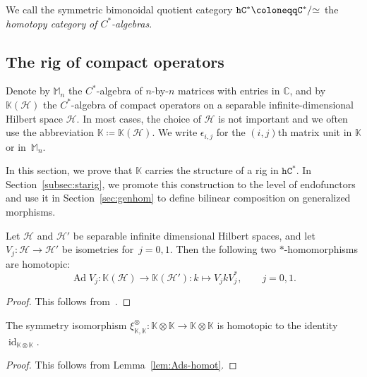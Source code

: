 \documentclass[10pt]{simplearticle}
\newcommand{\Ad}{\operatorname*{Ad}}
\newcommand{\id}{\operatorname{id}}
\newcommand{\Cstar}{\mathtt{C^{*}}}
\newcommand{\hCstar}{\mathtt{hC^{*}}}
\newcommand{\oK}{\mathbb{K}}
\newcommand{\oM}{\mathbb{M}}
\newcommand{\modrel}[1]{/\hspace{-0.6ex}#1\hspace{0.1ex}}
\begin{document}
\begin{defn}
We call the symmetric bimonoidal quotient category $\hCstar\coloneqq\Cstar\modrel{\simeq}$
the \emph{homotopy category} \emph{of $C^{*}$-algebras}.

\end{defn}

\subsection{\label{subsec:rig-comp}The rig of compact operators}

Denote by $\oM_{n}$ the $C^{*}$-algebra of $n$-by-$n$ matrices
with entries in $\mathbb{C}$, and by $\oK(\mathcal{H})$ the $C^{*}$-algebra
of compact operators on a separable infinite-dimensional Hilbert space
$\mathcal{H}$. In most cases, the choice of $\mathcal{H}$ is not
important and we often use the abbreviation $\oK\coloneqq\oK(\mathcal{H})$.
We write $\epsilon_{i,j}$ for the $(i,j)$th matrix unit in $\oK$
or in~$\oM_{n}$.

In this section,
we prove that $\oK$ carries the
structure of a rig in $\hCstar$. In Section~\ref{subsec:starig},
we promote this construction to the level of endofunctors and use
it in Section~\ref{sec:genhom} to define bilinear composition on
generalized morphisms.
\begin{lem}\label{lem:Ads-homot}
Let $\mathcal{H}$ and $\mathcal{H}'$ be separable
infinite dimensional Hilbert spaces, and let $V_{j}\colon\mathcal{H}\to\mathcal{H}'$
be isometries for~$j=0,1$. Then the following two $*$-homomorphisms
are homotopic:
\[
\Ad V_{j}\colon\oK(\mathcal{H})\to\oK(\mathcal{H}')\colon k\mapsto V_{j}kV^{*}_{j},\qquad j=0,1.
\]
\end{lem}

\begin{proof}
This follows from~\cite[Lemma~1.3.7]{Jensen-Thomsen}.
\end{proof}

\begin{cor}\label{cor:ae}
The symmetry isomorphism $\xi^{\otimes}_{\oK,\oK}\colon\oK\otimes\oK\to\oK\otimes\oK$
is homotopic to the identity $\id_{\oK\otimes\oK}$.
\end{cor}

\begin{proof}
This follows from Lemma~\ref{lem:Ads-homot}.
\end{proof}
\end{document}
